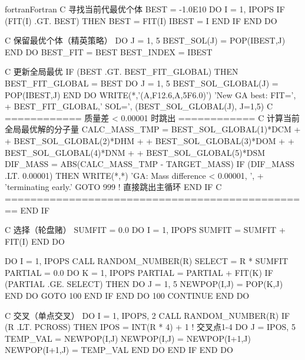 \begin{envcode}{fortran}{Fortran}
C         寻找当前代最优个体
          BEST = -1.0E10
          DO I = 1, IPOPS
              IF (FIT(I) .GT. BEST) THEN
                  BEST = FIT(I)
                  IBEST = I
              END IF
          END DO
          
C         保留最优个体（精英策略）
          DO J = 1, 5
              BEST_SOL(J) = POP(IBEST,J)
          END DO
          BEST_FIT = BEST
          BEST_INDEX = IBEST
          
C         更新全局最优
          IF (BEST .GT. BEST_FIT_GLOBAL) THEN
              BEST_FIT_GLOBAL = BEST
              DO J = 1, 5
                  BEST_SOL_GLOBAL(J) = POP(IBEST,J)
              END DO
              WRITE(*,'(A,F12.6,A,5F6.0)') 'New GA best: FIT=', 
     +        BEST_FIT_GLOBAL,' SOL=', (BEST_SOL_GLOBAL(J), J=1,5)
C         ============ 质量差 < 0.00001 时跳出 ============
C          计算当前全局最优解的分子量
              CALC_MASS_TMP = BEST_SOL_GLOBAL(1)*DCM 
     +                      + BEST_SOL_GLOBAL(2)*DHM
     +                      + BEST_SOL_GLOBAL(3)*DOM
     +                      + BEST_SOL_GLOBAL(4)*DNM
     +                      + BEST_SOL_GLOBAL(5)*DSM
              DIF_MASS = ABS(CALC_MASS_TMP - TARGET_MASS)
              IF (DIF_MASS .LT. 0.00001) THEN
                  WRITE(*,*) 'GA: Mass difference < 0.00001, ',
     +                       'terminating early.'
                  GOTO 999   ! 直接跳出主循环
              END IF
C         ================================================
          END IF
          
C         选择（轮盘赌）
          SUMFIT = 0.0
          DO I = 1, IPOPS
              SUMFIT = SUMFIT + FIT(I)
          END DO
          
          DO I = 1, IPOPS
              CALL RANDOM_NUMBER(R)
              SELECT = R * SUMFIT
              PARTIAL = 0.0
              DO K = 1, IPOPS
                  PARTIAL = PARTIAL + FIT(K)
                  IF (PARTIAL .GE. SELECT) THEN
                      DO J = 1, 5
                          NEWPOP(I,J) = POP(K,J)
                      END DO
                      GOTO 100
                  END IF
              END DO
100           CONTINUE
          END DO
          
C         交叉（单点交叉）
          DO I = 1, IPOPS, 2
              CALL RANDOM_NUMBER(R)
              IF (R .LT. PCROSS) THEN
                  IPOS = INT(R * 4) + 1   ! 交叉点1-4
                  DO J = IPOS, 5
                      TEMP_VAL = NEWPOP(I,J)
                      NEWPOP(I,J) = NEWPOP(I+1,J)
                      NEWPOP(I+1,J) = TEMP_VAL
                  END DO
              END IF
          END DO
          

\end{envcode}
